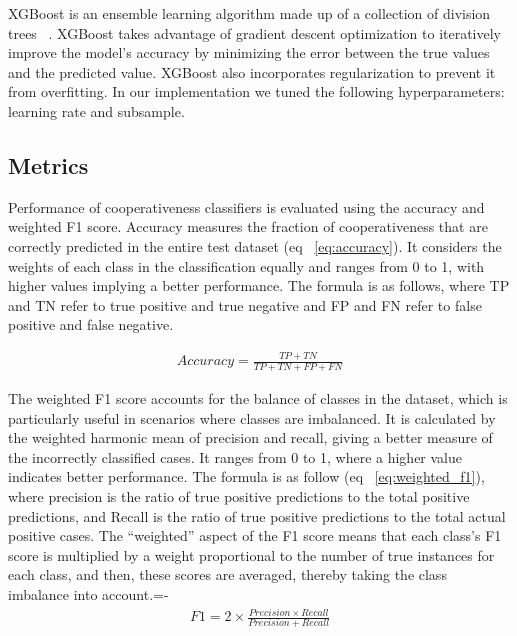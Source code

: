 XGBoost is an ensemble learning algorithm made up of a collection of division trees ~\cite{Chen_2016}. XGBoost takes advantage of gradient descent optimization to iteratively improve the model’s accuracy by minimizing the error between the true values and the predicted value. XGBoost also incorporates regularization to prevent it from overfitting. In our implementation we tuned the following hyperparameters: learning rate and subsample.

\subsection{Metrics}
Performance of cooperativeness classifiers is evaluated using the accuracy and weighted F1 score. Accuracy measures the fraction of cooperativeness that are correctly predicted in the entire test dataset (eq ~\ref{eq:accuracy}). It considers the weights of each class in the classification equally and ranges from 0 to 1, with higher values implying a better performance. The formula is as follows, where TP and TN refer to true positive and true negative and FP and FN refer to false positive and false negative.

\begin{equation}\label{eq:accuracy}
    \begin{gathered}
        Accuracy = \frac{TP + TN}{TP + TN + FP + FN}
    \end{gathered}
\end{equation}

The weighted F1 score accounts for the balance of classes in the dataset, which is particularly useful in scenarios where classes are imbalanced. It is calculated by the weighted harmonic mean of precision and recall, giving a better measure of the incorrectly classified cases. It ranges from 0 to 1, where a higher value indicates better performance. The formula is as follow (eq ~\ref{eq:weighted_f1}), where precision is the ratio of true positive predictions to the total positive predictions, and Recall is the ratio of true positive predictions to the total actual positive cases. The ``weighted'' aspect of the F1 score means that each class's F1 score is multiplied by a weight proportional to the number of true instances for each class, and then, these scores are averaged, thereby taking the class imbalance into account.=-
\begin{equation}\label{eq:weighted_f1}
\begin{gathered}
F1 = 2 \times \frac{Precision \times Recall}{Precision + Recall}
\end{gathered}
\end{equation}


